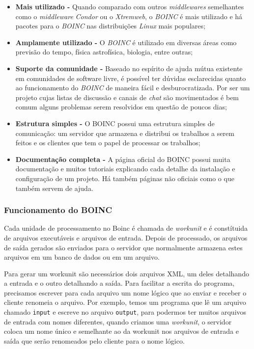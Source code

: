 \begin{itemize}
  \item \textbf{Mais utilizado -} Quando comparado com outros \emph{middlewares} semelhantes como o \textit{middleware} 
\emph{Condor} ou o \emph{Xtremweb}, o \emph{BOINC} é mais utilizado e há pacotes para o \emph{BOINC} nas 
distribuições \emph{Linux} mais populares;
  \item \textbf{Amplamente utilizado -} O \emph{BOINC} é utilizado em diversas áreas como previsão do tempo, física
astrofísica, biologia, entre outras;
  \item \textbf{Suporte da comunidade -} Baseado no espírito de ajuda mútua existente em comunidades de software livre, é 
possível ter dúvidas esclarecidas quanto ao funcionamento do \emph{BOINC} de maneira fácil e desburocratizada. Por ser um projeto
cujas listas de discussão e canais de \textit{chat} são movimentados é bem comum alguns problemas serem resolvidos em questão de 
poucos dias;
  \item \textbf{Estrutura simples -} O BOINC possui uma estrutura simples de comunicação: um servidor que armazena e 
distribui os trabalhos a serem feitos e os clientes que tem o papel de processar os trabalhos;
  \item \textbf{Documentação completa -} A página oficial do BOINC possui muita documentação e muitos tutoriais explicando
cada detalhe da instalação e configuração de um projeto. Há também páginas não oficiais como o %
que também servem de ajuda.
\end{itemize}



\subsubsection{Funcionamento do BOINC}


Cada unidade de processamento no Boinc é chamada de \emph{workunit} e é constítuida de arquivos executáveis e 
arquivos de entrada. Depois de processado, os arquivos de saída gerados são enviados para o servidor que
normalmente armazena estes arquivos em um banco de dados ou em um arquivo.

Para gerar um workunit são necessários dois arquivos XML, um deles detalhando a entrada e o 
outro detalhando a saída. Para facilitar a escrita do programa, precisamos escrever para cada arquivo um nome lógico 
que ao enviar e receber o cliente renomeia o arquivo. Por exemplo, temos um programa que lê um arquivo chamado 
\verb#input# e escreve no arquivo \verb#output#, para podermos ter muitos arquivos de entrada com nomes diferentes, quando
criamos uma \emph{workunit}, o servidor coloca um nome único e semelhante ao da workunit nos arquivos de entrada e saída que serão renomeados
pelo cliente para o nome lógico.

